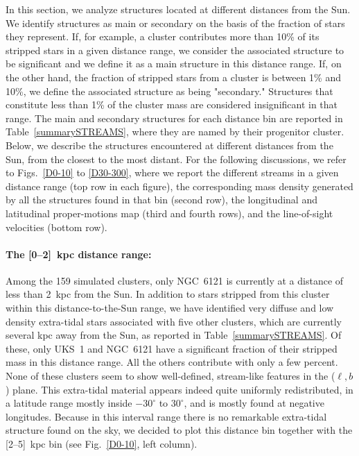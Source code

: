     In this section, we analyze structures located at different distances from the Sun. We identify structures as main or secondary on the basis of the fraction of stars they represent. If, for example, a cluster contributes more than 10\% of its stripped stars in a given distance range, we consider the associated structure to be significant and we define it as a main structure in this distance range. If, on the other hand, the fraction of stripped stars from a cluster is between 1\% and 10\%, we define the associated structure  as being "secondary." Structures that constitute less than 1\% of the cluster mass are considered insignificant in that range. The main and secondary structures for each distance bin are reported in Table~\ref{summarySTREAMS}, where they are named by their progenitor cluster. Below, we describe the structures encountered at different distances from the Sun, from the closest to the most distant. For the following discussions,  we refer to Figs.~\ref{D0-10} to \ref{D30-300}, where we report the different streams in a given distance range (top row in each figure), the corresponding mass density generated by all the structures found in that bin (second row), the longitudinal and latitudinal proper-motions map (third and fourth rows), and the line-of-sight velocities (bottom row).

    \paragraph{The [0--2]~kpc distance range: }
    Among the 159 simulated clusters, only  NGC~6121 is currently at a distance of less than 2~kpc from the Sun. In addition to stars stripped from this cluster within this distance-to-the-Sun range, we have identified very diffuse and low density extra-tidal stars associated with five other clusters, which are currently several kpc away from the Sun, as reported in Table~\ref{summarySTREAMS}. Of these, only UKS~1 and NGC~6121 have a significant fraction of their stripped mass in this distance range. All the others contribute with only a few percent. None of these clusters seem to show well-defined, stream-like features in the ($\ell,b$) plane. This extra-tidal material appears indeed quite uniformly redistributed, in a latitude range mostly inside $-30^\circ$ to $30^\circ$, and is mostly found at negative longitudes. Because in this interval range there is no remarkable extra-tidal structure found on the sky, we decided to plot this distance bin together with the [2--5]~kpc bin (see Fig.~\ref{D0-10}, left column).


